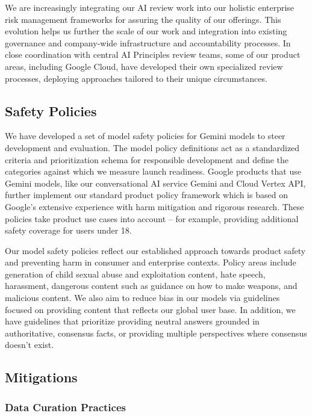 We are increasingly integrating our AI review work into our holistic enterprise risk management frameworks for assuring the quality of our offerings. This evolution helps us further the scale of our work and integration into existing governance and company-wide infrastructure and accountability processes. In close coordination with central AI Principles review teams, some of our product areas, including Google Cloud, have developed their own specialized review processes, deploying approaches tailored to their unique circumstances. 

\subsection{Safety Policies}

We have developed a set of model safety policies for Gemini models to steer development and evaluation. The model policy definitions act as a standardized criteria and prioritization schema for responsible development and define the categories against which we measure launch readiness. Google products that use Gemini models, like our conversational AI service Gemini and Cloud Vertex API, further implement our standard product policy framework which is based on Google’s extensive experience with harm mitigation and rigorous research.  These policies take product use cases into account – for example, providing additional safety coverage for users under 18.

Our model safety policies reflect our established approach towards product safety and preventing harm in consumer and enterprise contexts. Policy areas include generation of child sexual abuse and exploitation content, hate speech, harassment, dangerous content such as guidance on how to make weapons, and malicious content. We also aim to reduce bias in our models via  guidelines focused on providing content that reflects our global user base.  In addition, we have guidelines that prioritize providing neutral answers grounded in authoritative, consensus facts, or providing multiple perspectives where consensus doesn’t exist.  

\subsection{Mitigations}
\subsubsection{Data Curation Practices}
\label{sec:data_curation}

